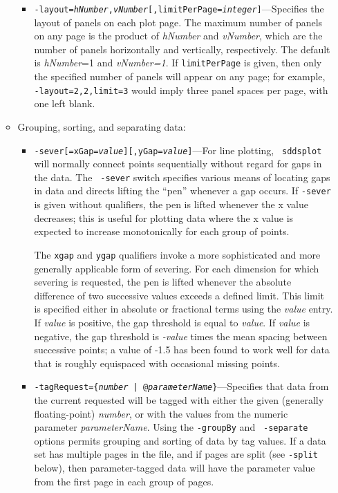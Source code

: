 \begin{itemize}
\begin{itemize}
\begin{itemize}
  \item {\tt -layout={\em hNumber},{\em vNumber}[,limitPerPage={\em integer}]}---Specifies the layout
of panels on each plot page.  The maximum number of panels on any page is the product of {\em
hNumber} and {\em vNumber}, which are the number of panels horizontally and vertically, respectively.
The default is {\em hNumber}=1 and {\em vNumber=1}.  If {\tt limitPerPage} is given, then only the
specified number of panels will appear on any page; for example, {\tt -layout=2,2,limit=3} would
imply three panel spaces per page, with one left blank.

  \end{itemize}

\item Grouping, sorting, and separating data:

  \begin{itemize} \item {\tt -sever[=xGap={\em value}][,yGap={\em value}]}---For line plotting, {\tt
sddsplot} will normally connect points sequentially without regard for gaps in the data.  The {\tt
-sever} switch specifies various means of locating gaps in data and directs lifting the ``pen''
whenever a gap occurs.  If {\tt -sever} is given without qualifiers, the pen is lifted whenever the x
value decreases; this is useful for plotting data where the x value is expected to increase
monotonically for each group of points.

The {\tt xgap} and {\tt ygap} qualifiers invoke a more sophisticated and more generally applicable form of
severing.  For each dimension for which severing is requested, the pen is lifted whenever the absolute
difference of two successive values exceeds a defined limit.  This limit is specified either in absolute
or fractional terms using the {\em value} entry.  If {\em value} is positive, the gap threshold is equal
to {\em value}.  If {\em value} is negative, the gap threshold is {\em -value} times the mean spacing
between successive points; a value of -1.5 has been found to work well for data that is roughly equispaced
with occasional missing points.

  \item {\tt -tagRequest=\{{\em number} | @{\em parameterName}\}}---Specifies that data from the
current requested will be tagged with either the given (generally floating-point) {\em number}, or
with the values from the numeric parameter {\em parameterName}.  Using the {\tt -groupBy} and {\tt
-separate} options permits grouping and sorting of data by tag values.  If a data set has multiple
pages in the file, and if pages are split (see {\tt -split} below), then parameter-tagged data will
have the parameter value from the first page in each group of pages.


\end{itemize}
\end{itemize}
\end{itemize}
